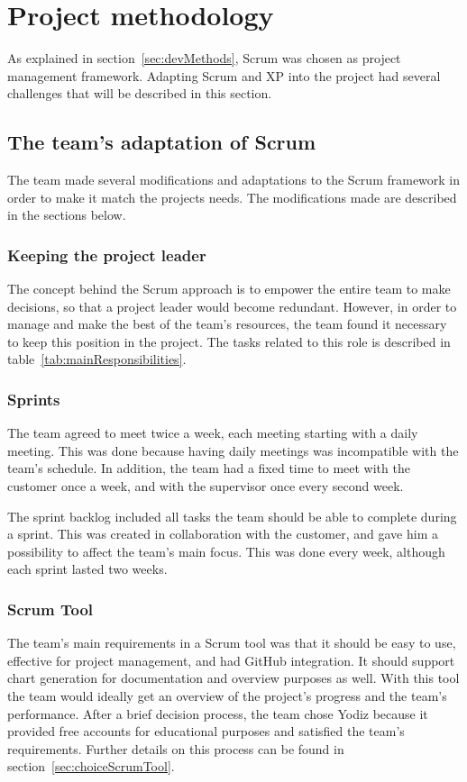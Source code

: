 \newpage
\section{Project methodology}
\label{sec:scrumDevProcess}

As explained in section~\ref{sec:devMethods}, Scrum was chosen as project management framework. Adapting Scrum and XP into the project had several challenges that will be described in this section.

\subsection{The team's adaptation of Scrum}
The team made several modifications and adaptations to the Scrum framework in order to make it match the projects needs. The modifications made are described in the sections below.

\subsubsection{Keeping the project leader}
The concept behind the Scrum approach is to empower the entire team to make decisions, so that a project leader would become redundant. However, in order to manage and make the best of the team's resources, the team found it necessary to keep this position in the project. The tasks related to this role is described in table~\ref{tab:mainResponsibilities}.

\subsubsection{Sprints}
The team agreed to meet twice a week, each meeting starting with a daily meeting. This was done because having daily meetings was incompatible with the team's schedule. In addition, the team had a fixed time to meet with the customer once a week, and with the supervisor once every second week.

The sprint backlog included all tasks the team should be able to complete during a sprint. This was created in collaboration with the customer, and gave him a possibility to affect the team's main focus. This was done every week, although each sprint lasted two weeks.

\subsubsection{Scrum Tool}
\label{sec:scrumtool}
The team's main requirements in a Scrum tool was that it should be easy to use, effective for project management, and had GitHub integration. It should support chart generation for documentation and overview purposes as well. With this tool the team would ideally get an overview of the project's progress and the team's performance. After a brief decision process, the team chose Yodiz because it provided free accounts for educational purposes and satisfied the team's requirements. Further details on this process can be found in section~\ref{sec:choiceScrumTool}.

